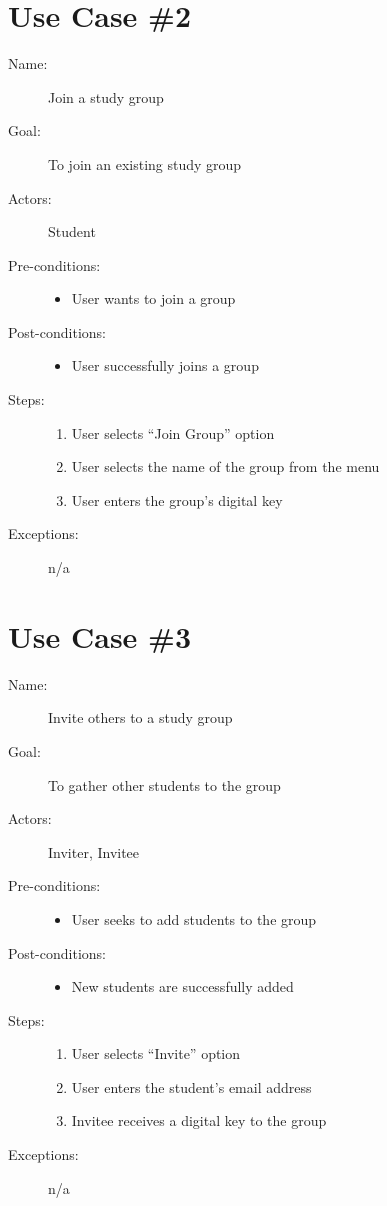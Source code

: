 \section{Use Case \#2}
	\begin{description}
		\item[Name:] Join a study group
		\item[Goal:] To join an existing study group
		\item[Actors:] Student
		\item[Pre-conditions:]
		\begin{itemize}
			\item User wants to join a group
		\end{itemize}
		\item[Post-conditions:]
		\begin{itemize}
			\item User successfully joins a group
		\end{itemize}
		\item[Steps:]
		\begin{enumerate}
			\item User selects “Join Group” option
			\item User selects the name of the group from the menu
			\item User enters the group’s digital key
		\end{enumerate}
		\item[Exceptions:] n/a		
	\end{description}
	
\section{Use Case \#3}
	\begin{description}
		\item[Name:] Invite others to a study group
		\item[Goal:] To gather other students to the group
		\item[Actors:] Inviter, Invitee
		\item[Pre-conditions:]
		\begin{itemize}
			\item User seeks to add students to the group
		\end{itemize}
		\item[Post-conditions:]
		\begin{itemize}
			\item New students are successfully added
		\end{itemize}
		\item[Steps:]
		\begin{enumerate}
			\item User selects “Invite” option
			\item User enters the student’s email address
			\item Invitee receives a digital key to the group
		\end{enumerate}
		\item[Exceptions:] n/a		
	\end{description}

